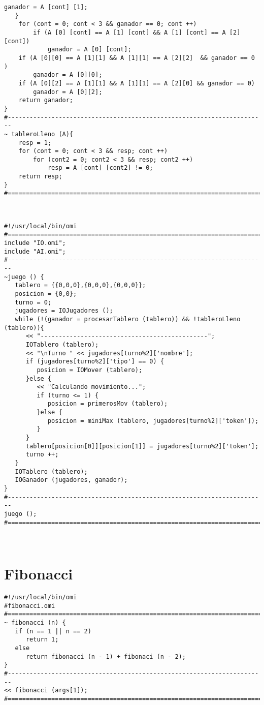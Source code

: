 \begin{lstlisting}[language=omi]
			ganador = A [cont] [1];
   }
	for (cont = 0; cont < 3 && ganador == 0; cont ++)
		if (A [0] [cont] == A [1] [cont] && A [1] [cont] == A [2] [cont])
			ganador = A [0] [cont];
	if (A [0][0] == A [1][1] && A [1][1] == A [2][2]  && ganador == 0 )
		ganador = A [0][0];
	if (A [0][2] == A [1][1] && A [1][1] == A [2][0] && ganador == 0)
		ganador = A [0][2];
	return ganador;
}
#-----------------------------------------------------------------------
~ tableroLleno (A){
	resp = 1;
	for (cont = 0; cont < 3 && resp; cont ++)
		for (cont2 = 0; cont2 < 3 && resp; cont2 ++)
			resp = A [cont] [cont2] != 0;
	return resp;
}
#=======================================================================
\end{lstlisting}
\hfill\\

\begin{lstlisting}[language=omi]
#!/usr/local/bin/omi
#=======================================================================
include "IO.omi";
include "AI.omi";
#-----------------------------------------------------------------------
~juego () {
   tablero = {{0,0,0},{0,0,0},{0,0,0}};
   posicion = {0,0};
   turno = 0;
   jugadores = IOJugadores ();
   while (!(ganador = procesarTablero (tablero)) && !tableroLleno (tablero)){
      << "----------------------------------------------";
      IOTablero (tablero);
      << "\nTurno " << jugadores[turno%2]['nombre'];
      if (jugadores[turno%2]['tipo'] == 0) {
         posicion = IOMover (tablero);
      }else {
         << "Calculando movimiento...";
         if (turno <= 1) {
            posicion = primerosMov (tablero);
         }else {
            posicion = miniMax (tablero, jugadores[turno%2]['token']);
         }
      }
      tablero[posicion[0]][posicion[1]] = jugadores[turno%2]['token'];
      turno ++;
   }
   IOTablero (tablero);
   IOGanador (jugadores, ganador);
}
#-----------------------------------------------------------------------
juego ();
#======================================================================$
\end{lstlisting}
\hfill\\

\section{Fibonacci}
\label{sec:fibonacci}
\begin{lstlisting}[language=omi]
#!/usr/local/bin/omi
#fibonacci.omi
#=======================================================================
~ fibonacci (n) {
   if (n == 1 || n == 2) 
      return 1;
   else 
      return fibonacci (n - 1) + fibonaci (n - 2); 
}
#-----------------------------------------------------------------------
<< fibonacci (args[1]);
#=======================================================================
\end{lstlisting}
\hfill\\

